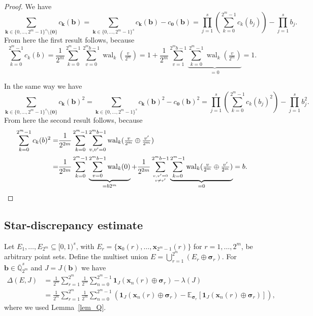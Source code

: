 \documentclass[12pt]{article}
\theoremstyle{definition}
\numberwithin{equation}{section}
\begin{document}
\begin{proof}
We have $$\sum_{\bm{k} \in \{0, \ldots, 2^m-1\}^s \setminus\{\bm{0}\}} c_{\bm{k}}(\bm{b}) = \sum_{\bm{k} \in \{0, \ldots, 2^m-1\}^s} c_{\bm{k}}(\bm{b}) -c_{\bm{0}}(\bm{b}) = \prod_{j=1}^s \left(\sum_{k=0}^{2^m-1} c_k(b_j)\right) - \prod_{j=1}^s b_j.$$
From here the first result follows, because $$\sum_{k=0}^{2^m-1} c_k(b)=\frac{1}{2^m} \sum_{k=0}^{2^m-1} \sum_{v=0}^{2^m b-1}  \operatorname{wal}_k(\tfrac{v}{2^m})=1+\frac{1}{2^m}\sum_{v=1}^{2^m b -1} \underbrace{\sum_{k=0}^{2^m-1}\operatorname{wal}_k(\tfrac{v}{2^m})}_{=0}=1.$$

In the same way we have
$$\sum_{\bm{k} \in \{0, \ldots, 2^m-1\}^s \setminus\{\bm{0}\}} c_{\bm{k}}(\bm{b})^2 = \sum_{\bm{k} \in \{0, \ldots, 2^m-1\}^s} c_{\bm{k}}(\bm{b})^2 -c_{\bm{0}}(\bm{b})^2 = \prod_{j=1}^s \left(\sum_{k=0}^{2^m-1} c_k(b_j)^2\right) - \prod_{j=1}^s b_j^2.$$ From here the second result follows, because 
\begin{align*}
\sum_{k=0}^{2^m-1} c_k(b)^2 = & \frac{1}{2^{2m}} \sum_{k=0}^{2^m-1} \sum_{v,v'=0}^{2^m b-1}  \operatorname{wal}_k(\tfrac{v}{2^m} \oplus \tfrac{v'}{2^m})\\
= & \frac{1}{2^{2m}} \sum_{k=0}^{2^m-1} \underbrace{\sum_{v=0}^{2^m b-1}  \operatorname{wal}_k(0)}_{=b 2^{m}}+\frac{1}{2^{2m}}  \sum_{v,v'=0 \atop v\not= v'}^{2^m b-1}  \underbrace{\sum_{k=0}^{2^m-1}\operatorname{wal}_k(\tfrac{v}{2^m} \oplus \tfrac{v'}{2^m})}_{=0}=b.
\end{align*}

\end{proof}



\subsection{Star-discrepancy estimate}


Let $E_1, \ldots, E_{2^m} \subseteq [0,1)^s$, with $E_r = \{\bm{x}_0(r), \ldots, \bm{x}_{2^m-1}(r)\}$ for $ r = 1, \ldots, 2^m$, be arbitrary point sets. Define the multiset union $E = \bigcup_{r=1}^{2^m} (E_r \oplus \bm{\sigma}_r)$. For $\bm{b} \in \overline{\mathbb{Q}}_{2^m}^s$ and $J=J(\bm{b})$ we have
\begin{align*}
 \Delta(E, J)   & = \frac{1}{2^m} \sum_{r=1}^{2^m} \frac{1}{2^m} \sum_{n=0}^{2^m-1} \bm{1}_J(\bm{x}_n(r) \oplus \bm{\sigma}_r) - \lambda(J)  \\ & = \frac{1}{2^m} \sum_{r=1}^{2^m} \frac{1}{2^m} \sum_{n=0}^{2^m-1} \left( \bm{1}_J(\bm{x}_n(r) \oplus \bm{\sigma}_r) - \mathbb{E}_{\bm{\sigma}_r}[\bm{1}_{J}(\bm{x}_n(r) \oplus \bm{\sigma}_r)] \right),
\end{align*}
where we used Lemma~\ref{lem_Q}.
\end{document}
